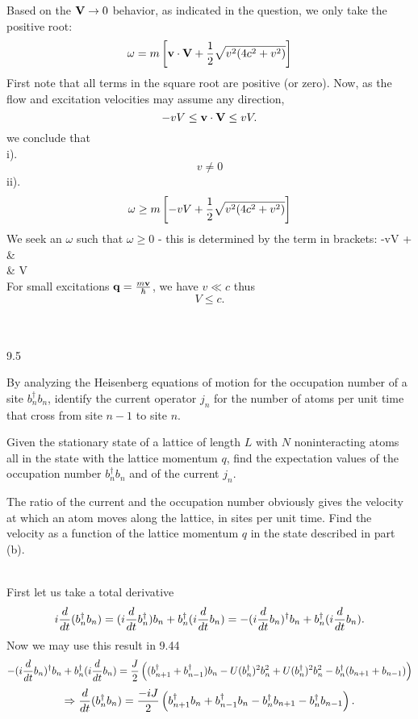 \documentclass[10pt,letterpaper]{article}
\begin{document}
\item
Based on the $\mathbf{V}\to 0$ behavior, as indicated in the question, we only take the positive root:
\[
	\omega = m\left[ \mathbf{v}\cdot \mathbf{V} +\frac{1}{2}\sqrt{v^2(4c^2+v^2)}\right]
\]
First note that all terms in the square root are positive (or zero). Now, as the flow and excitation velocities may assume any direction,
\[
	-vV\le \mathbf{v}\cdot \mathbf{V} \le vV.
\]
we conclude that \\
i). 
\[ v \ne 0 \]
ii).
\[ 
	\omega \ge m\left[ -vV +\frac{1}{2}\sqrt{v^2(4c^2+v^2)}\right]
\]
We seek an $\omega$ such that $\omega \ge 0$ - this is determined by the term in brackets:
\ba
	 -vV + &\\
	& \ge V\\
\ea
For small excitations $\mathbf{q}=\frac{m\mathbf{v}}{\hbar}$, we have $v\ll c$ thus
\[
	V \le c.
\]\\ \\
\eenum
\item[9.5]
\benum
\item
By analyzing the Heisenberg equations of motion for the occupation number of a site $b_n^\dag b_n$, identify
the current operator $j_n$ for the number of atoms per unit time that cross from site $n-1$ to site $n$.
\item
Given the stationary state of a lattice of length $L$ with $N$ noninteracting atoms all in the state with the lattice
momentum $q$, find the expectation values of the occupation number $b_n^\dag b_n$ and of the current $j_n$.
\item
The ratio of the current and the occupation number obviously gives the velocity at which an atom moves along the lattice, in sites per unit time. Find the velocity as a function of the lattice momentum $q$ in the state described in part (b).\\ \\
\eenum
\benum
\item
First let us take a total derivative
\[
	i\frac{d}{dt}(b_n^\dag b_n) = (i\frac{d}{dt}b_n^\dag)b_n + b_n^\dag(i\frac{d}{dt}b_n) = -(i\frac{d}{dt}b_n)^\dag b_n
	+b_n^\dag(i\frac{d}{dt}b_n).
\]
Now we may use this result in 9.44
\[
	-(i\frac{d}{dt}b_n)^\dag b_n+b_n^\dag(i\frac{d}{dt}b_n) = \frac{J}{2}\left((b_{n+1}^\dag +b_{n-1}^\dag)b_n -
	U(b^\dag_n)^2b_n^2+U(b^\dag_n)^2 b_n^2 - b_n^\dag (b_{n+1}+b_{n-1})\right)
\]
\[
	\Rightarrow \frac{d}{dt}(b_n^\dag b_n) = \frac{-iJ}{2}\left(b_{n+1}^\dag b_n +b_{n-1}^\dag b_n
	-b_n^\dag b_{n+1} -b_n^\dag b_{n-1}\right).
\]
\end{document}
